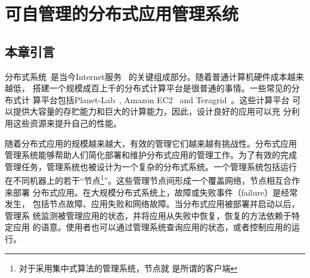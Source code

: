 \chapter{可自管理的分布式应用管理系统}
\label{chap:selfman}


%
%
%
%
%
%
%
%
%
%
%
%

\section{本章引言}

分布式系统~\cite{gfs, bigtable, dynamo}是当今Internet服务~
\cite{google, amazon}的关键组成部分。随着普通计算机硬件成本越来越低，
搭建一个规模成百上千的分布式计算平台是很普通的事情。一些常见的分布式计
算平台包括Planet-Lab~\cite{Bavier2004}, Amazon
EC2~\cite{Garfinkel2007} and Teragrid~\cite{Catlett2002}。这些计算平台
可以提供大容量的存贮能力和巨大的计算能力，因此，设计良好的应用可以充
分利用这些资源来提升自己的性能。

随着分布式应用的规模越来越大，有效的管理它们越来越有挑战性。分布式应用
管理系统能够帮助人们简化部署和维护分布式应用的管理工作。为了有效的完成
管理任务，管理系统也被设计为一个复杂的分布式系统。一个管理系统包括运行
在不同机器上的若干“节点\footnote{对于采用集中式算法的管理系统，节点就
是所谓的客户端}”。这些管理节点间形成一个覆盖网络，节点相互合作来部署
分布式应用。在大规模分布式系统上，故障或失败事件（failure）是经常发生，
包括节点故障、应用失败和网络故障。当分布式应用被部署并启动以后，管理系
统监测被管理应用的状态，并将应用从失败中恢复，恢复的方法依赖于特定应用
的语意。使用者也可以通过管理系统查询应用的状态，或者控制应用的运行。

